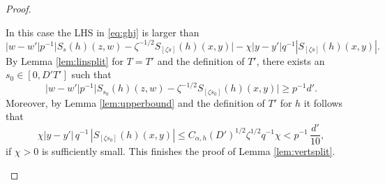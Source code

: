 \documentclass[10pt]{amsart}
\newcounter{case}
\theoremstyle{definition}
\theoremstyle{plain}
\begin{document}
\begin{proof}
\begin{enumerate}
In this case the LHS in \eqref{eq:ghj} is larger than
\[
\vert w-w' \vert p^{-1} \bigl|S_{s}(h)(z,w)-\zeta^{-1/2}S_{[\zeta s]}(h)(x,y)\bigr|-\chi\vert y-y'\vert q^{-1}|S_{[\zeta s]}(h)(x,y)|.\]
By Lemma \ref{lem:linsplit} for $T=T'$ and the definition of $T'$, there exists an $s_0\in [0,D'T']$ such that
\[
\vert w-w'\vert p^{-1} \bigl|S_{s_0}(h)(z,w)-\zeta^{-1/2}S_{[\zeta s_0]}(h)(x,y)\bigr|\geq p^{-1} d'.
\]
Moreover, by Lemma \ref{lem:upperbound} and the definition of $T'$ for $h$ it follows that
\[
\chi\vert y-y'\vert\, q^{-1}\,|S_{[\zeta s_0]}(h)(x,y)|\leq C_{\alpha,h}(D')^{1/2} \zeta^{1/2} q^{-1}\chi<p^{-1} \,\frac{d'}{10},
\]
if $\chi>0$ is sufficiently small. This finishes the proof of Lemma \ref{lem:vertsplit}.\qedhere
\end{enumerate}
\end{proof}
\end{document}
